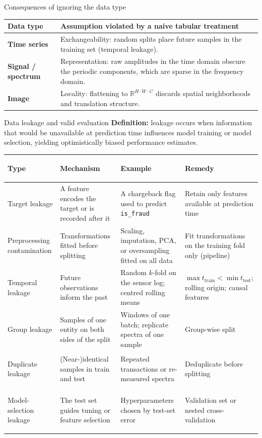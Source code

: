 \begin{frame}{Consequences of ignoring the data type}
\begin{tabularx}{\textwidth}{>{\bfseries}l X}
Data type & Assumption violated by a naive tabular treatment \\
\toprule
Time series & Exchangeability: random splits place future samples in the training set (temporal leakage). \\
Signal / spectrum & Representation: raw amplitudes in the time domain obscure the periodic components, which are sparse in the frequency domain. \\
Image & Locality: flattening to $\mathbb{R}^{H \cdot W \cdot C}$ discards spatial neighborhoods and translation structure. \\
\bottomrule
\end{tabularx}
\coursefooter
\end{frame}

\begin{frame}{Data leakage and valid evaluation}
\vspace{-0.4em}\begingroup\footnotesize \textbf{Definition:} leakage occurs when information that would be unavailable at prediction time influences model training or model selection, yielding optimistically biased performance estimates.\par\endgroup
\vspace{0.2em}

\begingroup\scriptsize
\begin{tabularx}{\textwidth}{>{\bfseries\raggedright\arraybackslash}p{2.3cm} >{\raggedright\arraybackslash}X >{\raggedright\arraybackslash}X >{\raggedright\arraybackslash}X}
Type & Mechanism & Example & Remedy \\
\toprule
Target leakage & A feature encodes the target or is recorded after it & A chargeback flag used to predict \texttt{is\_fraud} & Retain only features available at prediction time \\
\addlinespace[0.35em]
Preprocessing contamination & Transformations fitted before splitting & Scaling, imputation, PCA, or oversampling fitted on all data & Fit transformations on the training fold only (pipeline) \\
\addlinespace[0.35em]
Temporal leakage & Future observations inform the past & Random $k$-fold on the sensor log; centred rolling means & $\max t_{\text{train}} < \min t_{\text{test}}$; rolling origin; causal features \\
\addlinespace[0.35em]
Group leakage & Samples of one entity on both sides of the split & Windows of one batch; replicate spectra of one sample & Group-wise split \\
\addlinespace[0.35em]
Duplicate leakage & (Near-)identical samples in train and test & Repeated transactions or re-measured spectra & Deduplicate before splitting \\
\addlinespace[0.35em]
Model-selection leakage & The test set guides tuning or feature selection & Hyperparameters chosen by test-set error & Validation set or nested cross-validation \\
\bottomrule
\end{tabularx}
\endgroup
\coursefooter
\end{frame}


